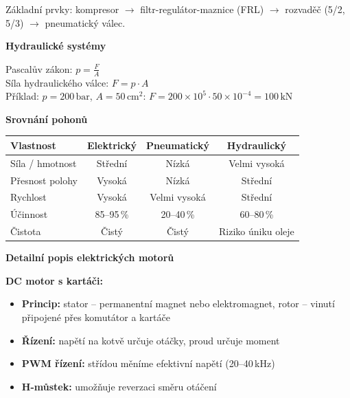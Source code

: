 \documentclass[a4paper,10pt]{article}
\begin{document}
\begin{vysvetlenibox}
Základní prvky: kompresor $\to$ filtr-regulátor-maznice (FRL)
$\to$ rozvaděč (5/2, 5/3) $\to$ pneumatický válec.

\textbf{Hydraulické systémy}

\begin{vzorcebox}
Pascalův zákon: $p = \frac{F}{A}$ \quad [Pa = N/m²]\\
Síla hydraulického válce: $F = p \cdot A$\\
Příklad: $p = 200\,\text{bar}$, $A = 50\,\text{cm}^2$:
$F = 200 \times 10^5 \cdot 50 \times 10^{-4} = 100\,\text{kN}$
\end{vzorcebox}

\textbf{Srovnání pohonů}

\begin{center}
\begin{tabular}{@{} l c c c @{}}
    \toprule
    \textbf{Vlastnost} & \textbf{Elektrický}
                       & \textbf{Pneumatický} & \textbf{Hydraulický} \\
    \midrule
    Síla / hmotnost & Střední & Nízká & Velmi vysoká \\
    Přesnost polohy & Vysoká & Nízká & Střední \\
    Rychlost        & Vysoká & Velmi vysoká & Střední \\
    Účinnost        & 85--95\,\% & 20--40\,\% & 60--80\,\% \\
    Čistota         & Čistý & Čistý & Riziko úniku oleje \\
    \bottomrule
\end{tabular}
\end{center}

\textbf{Detailní popis elektrických motorů}

\textbf{DC motor s kartáči:}
\begin{itemize}[noitemsep, leftmargin=1.4em, topsep=4pt]
    \item \textbf{Princip:} stator -- permanentní magnet nebo elektromagnet,
          rotor -- vinutí připojené přes komutátor a kartáče
    \item \textbf{Řízení:} napětí na kotvě určuje otáčky, proud určuje moment
    \item \textbf{PWM řízení:} střídou měníme efektivní napětí (20--40\,kHz)
    \item \textbf{H-můstek:} umožňuje reverzaci směru otáčení
\end{itemize}


\end{vysvetlenibox}
\end{document}
